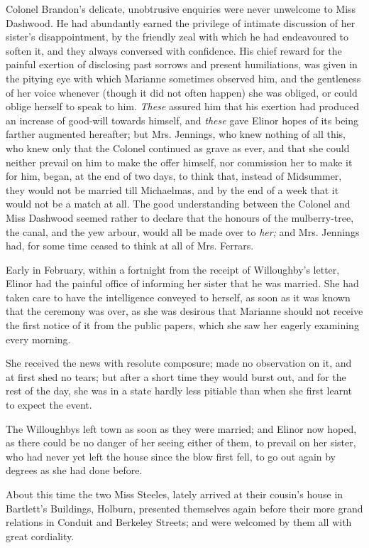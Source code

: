 Colonel Brandon's delicate, unobtrusive enquiries were never unwelcome to Miss Dashwood. He had abundantly earned the privilege of intimate discussion of her sister's disappointment, by the friendly zeal with which he had endeavoured to soften it, and they always conversed with confidence. His chief reward for the painful exertion of disclosing past sorrows and present humiliations, was given in the pitying eye with which Marianne sometimes observed him, and the gentleness of her voice whenever (though it did not often happen) she was obliged, or could oblige herself to speak to him. {\em These} assured him that his exertion had produced an increase of good-will towards himself, and {\em these} gave Elinor hopes of its being farther augmented hereafter; but Mrs. Jennings, who knew nothing of all this, who knew only that the Colonel continued as grave as ever, and that she could neither prevail on him to make the offer himself, nor commission her to make it for him, began, at the end of two days, to think that, instead of Midsummer, they would not be married till Michaelmas, and by the end of a week that it would not be a match at all. The good understanding between the Colonel and Miss Dashwood seemed rather to declare that the honours of the mulberry-tree, the canal, and the yew arbour, would all be made over to {\em her;} and Mrs. Jennings had, for some time ceased to think at all of Mrs. Ferrars.

Early in February, within a fortnight from the receipt of Willoughby's letter, Elinor had the painful office of informing her sister that he was married. She had taken care to have the intelligence conveyed to herself, as soon as it was known that the ceremony was over, as she was desirous that Marianne should not receive the first notice of it from the public papers, which she saw her eagerly examining every morning.

She received the news with resolute composure; made no observation on it, and at first shed no tears; but after a short time they would burst out, and for the rest of the day, she was in a state hardly less pitiable than when she first learnt to expect the event.

The Willoughbys left town as soon as they were married; and Elinor now hoped, as there could be no danger of her seeing either of them, to prevail on her sister, who had never yet left the house since the blow first fell, to go out again by degrees as she had done before.

About this time the two Miss Steeles, lately arrived at their cousin's house in Bartlett's Buildings, Holburn, presented themselves again before their more grand relations in Conduit and Berkeley Streets; and were welcomed by them all with great cordiality.

